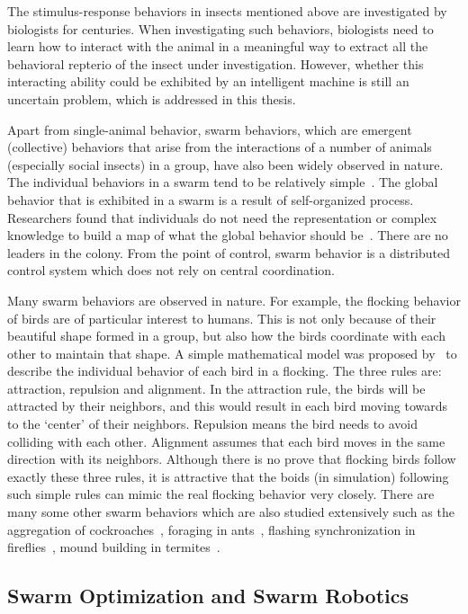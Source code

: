 The stimulus-response behaviors in insects mentioned above are investigated by biologists for centuries. When investigating such behaviors, biologists need to learn how to interact with the animal in a meaningful way to extract all the behavioral repterio of the insect under investigation. However, whether this interacting ability could be exhibited by an intelligent machine is still an uncertain problem, which is addressed in this thesis. 

Apart from single-animal behavior, swarm behaviors, which are emergent (collective) behaviors that arise from the interactions of a number of animals (especially social insects) in a group, have also been widely observed in nature. The individual behaviors in a swarm tend to be relatively simple~\cite{Camazine2001}. The global behavior that is exhibited in a swarm is a result of self-organized process. Researchers found that individuals do not need the representation or complex knowledge to build a map of what the global behavior should be~\cite{Garnier:SI:2007}. There are no leaders in the colony. From the point of control, swarm behavior is a distributed control system which does not rely on central coordination.

Many swarm behaviors are observed in nature. For example, the flocking behavior of birds are of particular interest to humans. This is not only because of their beautiful shape formed in a group, but also how the birds coordinate with each other to maintain that shape. A simple mathematical model was proposed by~\cite{Craig:CG:1987} to describe the individual behavior of each bird in a flocking. The three rules are: attraction, repulsion and alignment. In the attraction rule, the birds will be attracted by their neighbors, and this would result in each bird moving towards to the `center' of their neighbors. Repulsion means the bird needs to avoid colliding with each other. Alignment assumes that each bird moves in the same direction with its neighbors. Although there is no prove that flocking birds follow exactly these three rules, it is attractive that the boids (in simulation) following such simple rules can mimic the real flocking behavior very closely. There are many some other swarm behaviors which are also studied extensively such as the aggregation of cockroaches~\cite{Jeanson:AB:2005}, foraging in ants~\cite{Carroll1973}, flashing synchronization in fireflies~\cite{James:ARE:1971}, mound building in termites~\cite{Bruinsma:PHD:1979}. 

\subsection{Swarm Optimization and Swarm Robotics}\label{sec:swarm_optimization_swarm_robotics}

